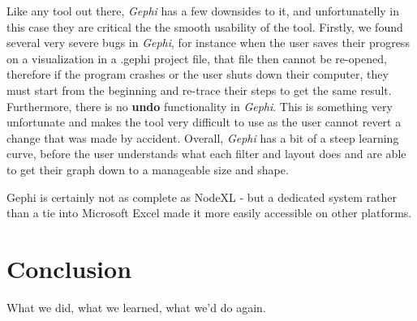 \documentclass[11pt,letterpaper]{article}
\begin{document}
Like any tool out there, \textit{Gephi} has a few downsides to it, and unfortunatelly in this case they are critical the the smooth usability of the tool. Firstly, we found several very severe bugs in \textit{Gephi}, for instance when the user saves their progress on a visualization in a .gephi project file, that file then cannot be re-opened, therefore if the program crashes or the user shuts down their computer, they must start from the beginning and re-trace their steps to get the same result. Furthermore, there is no \textbf{undo} functionality in \textit{Gephi}. This is something very unfortunate and makes the tool very difficult to use as the user cannot revert a change that was made by accident. Overall, \textit{Gephi} has a bit of a steep learning curve, before the user understands what each filter and layout does and are able to get their graph down to a manageable size and shape.

Gephi is certainly not as complete as NodeXL - but a dedicated system rather than a tie into Microsoft Excel made it more easily accessible on other platforms.

\section*{Conclusion}

What we did, what we learned, what we'd do again.



\end{document}
